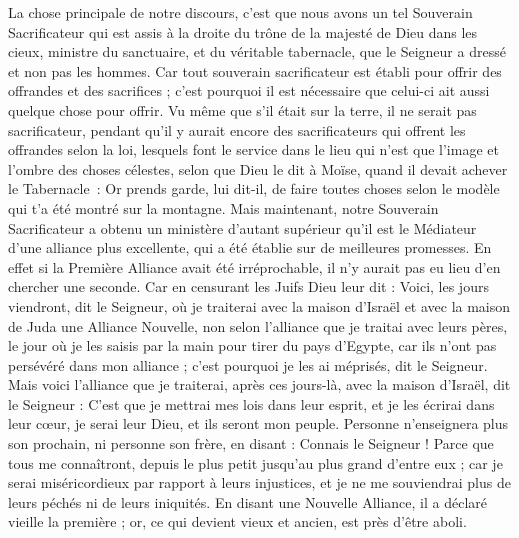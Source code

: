 \begin{multicols}{2}
\VerseOne{}La chose principale de notre discours, c'est que nous avons un tel Souverain Sacrificateur qui est assis à la droite du trône de la majesté de Dieu dans les cieux,
ministre du sanctuaire, et du véritable tabernacle, que le Seigneur a dressé et non pas les hommes.
Car tout souverain sacrificateur est établi pour offrir des offrandes et des sacrifices ; c'est pourquoi il est nécessaire que celui-ci ait aussi quelque chose pour offrir.
Vu même que s’il était sur la terre, il ne serait pas sacrificateur, pendant qu’il y aurait encore des sacrificateurs qui offrent les offrandes selon la loi,
lesquels font le service dans le lieu qui n’est que l’image et l’ombre des choses célestes, selon que Dieu le dit à Moïse, quand il devait achever le Tabernacle : Or prends garde, lui dit-il, de faire toutes choses selon le modèle qui t’a été montré sur la montagne.
Mais maintenant, notre Souverain Sacrificateur a obtenu un ministère d'autant supérieur qu'il est le Médiateur d'une alliance plus excellente, qui a été établie sur de meilleures promesses.
En effet si la Première Alliance avait été irréprochable, il n’y aurait pas eu lieu d’en chercher une seconde.
Car en censurant les Juifs Dieu leur dit : Voici, les jours viendront, dit le Seigneur, où je traiterai avec la maison d'Israël et avec la maison de Juda une Alliance Nouvelle,
non selon l'alliance que je traitai avec leurs pères, le jour où je les saisis par la main pour tirer du pays d'Egypte, car ils n'ont pas persévéré dans mon alliance ; c'est pourquoi je les ai méprisés, dit le Seigneur.
Mais voici l'alliance que je traiterai, après ces jours-là, avec la maison d'Israël, dit le Seigneur : C'est que je mettrai mes lois dans leur esprit, et je les écrirai dans leur cœur, je serai leur Dieu, et ils seront mon peuple.
Personne n'enseignera plus son prochain, ni personne son frère, en disant : Connais le Seigneur ! Parce que tous me connaîtront, depuis le plus petit jusqu'au plus grand d'entre eux ;
car je serai miséricordieux par rapport à leurs injustices, et je ne me souviendrai plus de leurs péchés ni de leurs iniquités.
En disant une Nouvelle Alliance, il a déclaré vieille la première ; or, ce qui devient vieux et ancien, est près d’être aboli.

\end{multicols}

